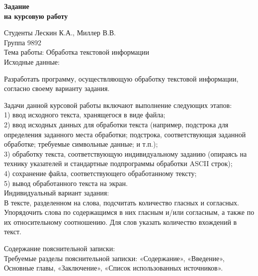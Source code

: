 \documentclass[12pt,a4paper]{article}%
\begin{document}
\begin{center}
	\Large{
		\textbf{Задание\\ на курсовую работу}
	}
\end{center}

Студенты Лескин К.А., Миллер В.В.\\

Группа 9892\\

Тема работы: Обработка текстовой информации\\

Исходные данные:

Разработать программу, осуществляющую обработку текстовой информации, согласно своему варианту задания.

Задачи данной курсовой работы включают выполнение следующих
этапов:\\
1) ввод исходного текста, хранящегося в виде файла;\\
2) ввод исходных данных для обработки текста (например, подстрока для
определения заданного места обработки; подстрока, соответствующая
заданной обработке; требуемые символьные данные; и т.п.);\\
3) обработку
текста,
соответствующую
индивидуальному
заданию
(опираясь на технику указателей и стандартные подпрограммы обработки
ASCII строк);\\
4) сохранение файла, соответствующего обработанному тексту;\\
5) вывод обработанного текста на экран.\\

Индивидуальный вариант задания:\\
В тексте, разделенном на слова, подсчитать количество
гласных и согласных. Упорядочить слова по содержащимся в них гласным
и/или согласным, а также по их относительному соотношению. Для слов
указать количество вхождений в текст.

\newpage

Содержание пояснительной записки:\\
Требуемые разделы пояснительной записки: «Содержание», «Введение», Основные главы,
«Заключение», «Список использованных источников».\\
\end{document}
